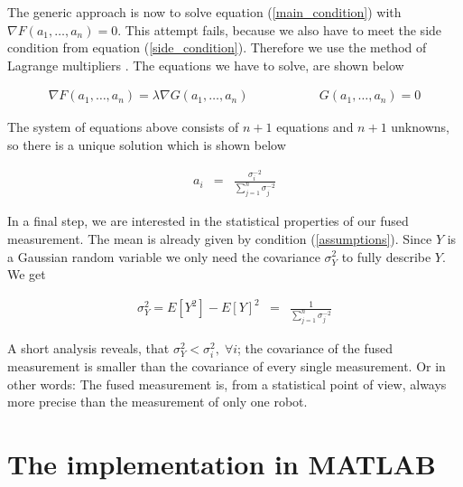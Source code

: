 The generic approach is now to solve equation (\ref{main_condition}) with \(\nabla F(a_1,\ldots,a_n) = 0\). This attempt fails, because we also have to meet the side condition from equation (\ref{side_condition}). Therefore we use the method of Lagrange multipliers \cite{Blatter}. The equations we have to solve, are shown below

\begin{enumerate}
	\begin{eqnarray}\label{lagrange_multipliers}
    			 \nabla F(a_1,\ldots,a_n) = \lambda \nabla G(a_1,\ldots,a_n) \qquad && \qquad G(a_1,\ldots,a_n) = 0
	\end{eqnarray}
\end{enumerate}

The system of equations above consists of \(n+1\) equations and \(n+1\) unknowns, so there is a unique solution which is shown below

\begin{enumerate}
	\begin{eqnarray}\label{solution}
    			 a_i &=& \frac{\sigma_i^{-2}}{\sum_{j=1}^n \sigma_j^{-2}}
	\end{eqnarray}
\end{enumerate}

In a final step, we are interested in the statistical properties of our fused measurement. The mean is already given by condition (\ref{assumptions}). Since \(Y\) is a Gaussian random variable we only need the covariance \(\sigma_Y^2\) to fully describe \(Y\). We get

\begin{enumerate}
	\begin{eqnarray}\label{solution}
    			 \sigma_Y^2 = E\left[ Y^2 \right] - E[Y]^2 &=& \frac{1}{\sum_{j=1}^n \sigma_j^{-2}}
	\end{eqnarray}
\end{enumerate}

A short analysis reveals, that \(\sigma_Y^2 < \sigma_i^2, \; \forall i\); the covariance of the fused measurement is smaller than the covariance of every single measurement. Or in other words: The fused measurement is, from a statistical point of view, always more precise than the measurement of only one robot.


\section{The implementation in MATLAB}


